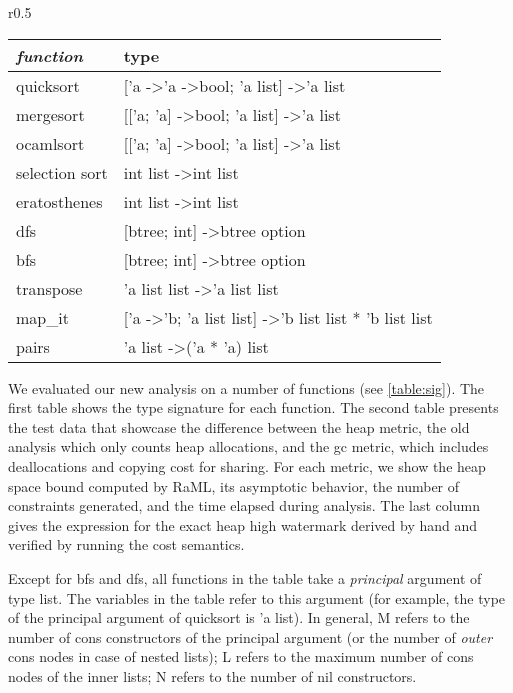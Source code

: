 \documentclass{easychair}
\theoremstyle{definition}
\begin{document}
\begin{wraptable}{r}{0.5\textwidth}
	\vspace{-20pt}
		\begin{center}
	\begin{tabular}{l l}
		\hline
		\textit{\textbf{function}} & type \\ \hline
		quicksort & {[}'a -\textgreater 'a -\textgreater bool; 'a list{]} -\textgreater 'a list \\
		mergesort & {[}{[}'a; 'a{]} -\textgreater bool; 'a list{]} -\textgreater 'a list \\
		ocamlsort & {[}{[}'a; 'a{]} -\textgreater bool; 'a list{]} -\textgreater 'a list \\
		selection sort & int list -\textgreater int list \\
		eratosthenes & int list -\textgreater int list \\
		dfs & {[}btree; int{]} -\textgreater btree option \\
		bfs & {[}btree; int{]} -\textgreater btree option \\
		transpose & 'a list list -\textgreater 'a list list \\
		map\_it & {[}'a -\textgreater 'b; 'a list list{]} -\textgreater 'b list list * 'b list list \\
		pairs & 'a list -\textgreater ('a * 'a) list \\ \hline
	\end{tabular}
			\end{center}
				\vspace{-20pt}
			\caption{Signature of Test Functions}
		\vspace{-10pt}
\label{table:sig}
\end{wraptable}

We evaluated our new analysis on a number of functions (see \ref{table:sig}). 
The first table shows the type signature for each function. The second table presents the test 
data that
showcase the difference between the heap metric, the old analysis which only counts 
heap allocations, and the gc metric, which includes deallocations and copying cost for sharing.
For each metric, we show the heap space bound computed by RaML, its asymptotic behavior, 
the number of constraints generated, and the time elapsed during analysis. The last column gives
the expression for the exact heap high watermark derived by hand and verified by running the 
cost semantics.

Except for bfs and dfs, all functions in the table take a \emph{principal} argument of type list. 
The variables in the table refer to this argument (for example, the type of the 
principal argument of 
quicksort is 'a list). In general, M refers to the number of cons constructors of the principal 
argument (or the number of \emph{outer} cons nodes in case of nested lists); L refers to the
maximum number of cons nodes of the inner lists; N refers to the number of nil constructors.
\end{document}
